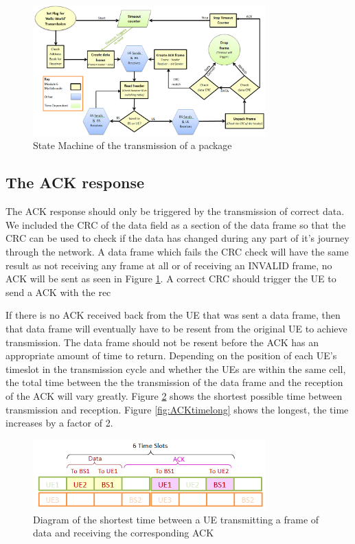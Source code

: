 \begin{figure}[ht]
    \centering
    \includegraphics[width=0.8\textwidth]{State_Machine_yellow.PNG}
    \caption{State Machine of the transmission of a package }
    \label{fig:stateMachine}
\end{figure}

\subsection {The ACK response }
The ACK response should only be triggered by the transmission of correct data. We included the CRC of the data field as a section of the data frame so that the CRC can be used to check if the data has changed during any part of it's journey through the network. A data frame which fails the CRC check will have the same result as not receiving any frame at all or of receiving an INVALID frame, no ACK will be sent as seen in Figure \ref{fig:stateMachine}. A correct CRC should trigger the UE to send a ACK with the rec

If there is no ACK received back from the UE that was sent a data frame, then that data frame will eventually have to be resent from the original UE to achieve transmission. The data frame should not be resent before the ACK has an appropriate amount of time to return. Depending on the position of each UE's timeslot in the transmission cycle and whether the UEs are within the same cell, the total time between the the transmission of the data frame and the reception of the ACK will vary greatly. Figure \ref{fig:ACKtimeshort} shows the shortest possible time between transmission and reception. Figure \ref{fig:ACKtimelong} shows the longest, the time increases by a factor of 2. 
\begin{figure}[ht]
    \centering
    \includegraphics[width=0.8\textwidth]{ACK_timeout_short.PNG}
    \caption{Diagram of the shortest time between a UE transmitting a frame of data and receiving the corresponding ACK}
    \label{fig:ACKtimeshort}
\end{figure}

